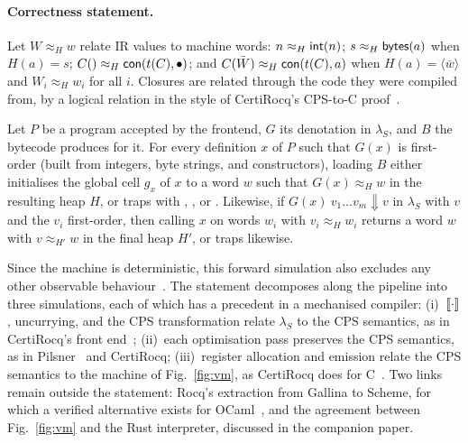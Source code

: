 \paragraph{Correctness statement.}
Let $W \approx_H w$ relate IR values to machine words: $n \approx_H \mathsf{int}(n)$; $s \approx_H \mathsf{bytes}(a)$ when $H(a) = s$; $C() \approx_H \mathsf{con}(t(C), \bullet)$; and $C(\bar{W}) \approx_H \mathsf{con}(t(C), a)$ when $H(a) = \langle \bar{w} \rangle$ and $W_i \approx_H w_i$ for all $i$.
Closures are related through the code they were compiled from, by a logical relation in the style of CertiRocq's CPS-to-C proof~\cite{savarybelanger2019cpstoc}.

\begin{conjecture}
\label{conj:correct}
Let $P$ be a program accepted by the frontend, $G$ its denotation in $\lambda_S$, and $B$ the bytecode \encore{} produces for it.
For every definition $x$ of $P$ such that $G(x)$ is first-order (built from integers, byte strings, and constructors), loading $B$ either initialises the global cell $g_x$ of $x$ to a word $w$ such that $G(x) \approx_H w$ in the resulting heap $H$, or traps with , , or .
Likewise, if $G(x)\ v_1 \dots v_m \Downarrow v$ in $\lambda_S$ with $v$ and the $v_i$ first-order, then calling $x$ on words $w_i$ with $v_i \approx_H w_i$ returns a word $w$ with $v \approx_{H'} w$ in the final heap $H'$, or traps likewise.
\end{conjecture}

\noindent
Since the machine is deterministic, this forward simulation also excludes any other observable behaviour~\cite{leroy2009mechanized}.
The statement decomposes along the pipeline into three simulations, each of which has a precedent in a mechanised compiler:
(i)~$[\![\cdot]\!]$, uncurrying, and the CPS transformation relate $\lambda_S$ to the CPS semantics, as in CertiRocq's front end~\cite{paraskevopoulou2019closure};
(ii)~each optimisation pass preserves the CPS semantics, as in Pilsner~\cite{neis2015pilsner} and CertiRocq;
(iii)~register allocation and emission relate the CPS semantics to the machine of Fig.~\ref{fig:vm}, as CertiRocq does for C~\cite{savarybelanger2019cpstoc}.
Two links remain outside the statement: Rocq's extraction from Gallina to Scheme, for which a verified alternative exists for OCaml~\cite{forster2024verified}, and the agreement between Fig.~\ref{fig:vm} and the Rust interpreter, discussed in the companion paper.

\FloatBarrier

